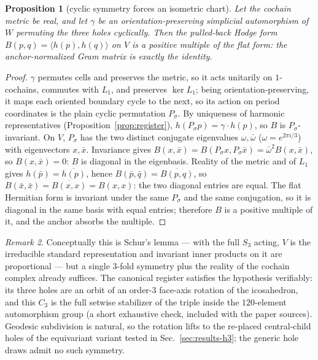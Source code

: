 \documentclass[a4paper,twocolumn,11pt,unpublished]{quantumarticle}
\theoremstyle{plain}
\newtheorem{proposition}{Proposition}
\theoremstyle{remark}
\newtheorem{remark}[proposition]{Remark}
\newcommand{\kerL}{\ker L}
\begin{document}
\begin{proposition}[cyclic symmetry forces an isometric chart]
\label{prop:isometry}
Let the cochain metric be real, and let $\gamma$ be an
orientation-preserving simplicial automorphism of $W$ permuting the
three holes cyclically. Then the pulled-back Hodge form
$B(p,q)=\langle h(p),h(q)\rangle$ on $V$ is a positive multiple of the
flat form: the anchor-normalized Gram matrix is exactly the identity.
\end{proposition}

\begin{proof}
$\gamma$ permutes cells and preserves the metric, so it acts unitarily
on $1$-cochains, commutes with $L_1$, and preserves $\kerL_1$; being
orientation-preserving, it maps each oriented boundary cycle to the next,
so its action on period coordinates is the plain cyclic permutation
$P_\sigma$. By uniqueness of harmonic representatives
(Proposition~\ref{prop:register}), $h(P_\sigma p)=\gamma\cdot h(p)$, so
$B$ is $P_\sigma$-invariant. On $V$, $P_\sigma$ has the two distinct
conjugate eigenvalues $\omega,\bar\omega$ ($\omega=e^{2\pi i/3}$) with
eigenvectors $x,\bar x$. Invariance gives
$B(x,\bar x)=B(P_\sigma x,P_\sigma\bar x)=\bar\omega^2 B(x,\bar x)$,
so $B(x,\bar x)=0$: $B$ is diagonal in the eigenbasis. Reality of the
metric and of $L_1$ gives $h(\bar p)=\overline{h(p)}$, hence
$B(\bar p,\bar q)=\overline{B(p,q)}$, so
$B(\bar x,\bar x)=\overline{B(x,x)}=B(x,x)$: the two diagonal entries
are equal. The flat Hermitian form is invariant under the same
$P_\sigma$ and the same conjugation, so it is diagonal in the same basis
with equal entries; therefore $B$ is a positive multiple of it, and the
anchor absorbs the multiple.
\end{proof}

\begin{remark}
\label{rem:schur}
Conceptually this is Schur's lemma --- with the full $S_3$ acting, $V$ is
the irreducible standard representation and invariant inner products on
it are proportional --- but a single $3$-fold symmetry plus the reality
of the cochain complex already suffices. The canonical register
satisfies the hypothesis verifiably: its three holes are an orbit of an
order-$3$ face-axis rotation of the icosahedron, and this $C_3$ is the
full setwise stabilizer of the triple inside the $120$-element
automorphism group (a short exhaustive check, included with the paper
sources). Geodesic subdivision is natural, so the rotation lifts to the
re-placed central-child holes of the equivariant variant tested in
Sec.~\ref{sec:results-h3}; the generic hole draws admit no such symmetry.
\end{remark}
\end{document}
